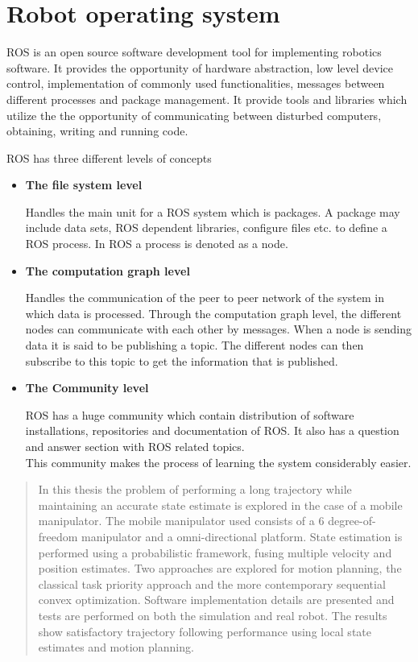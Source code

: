\documentclass[times, utf8, diplomski, english]{fer}
\begin{document}
\chapter{Robot operating system}\label{sec:def_ROS}
ROS is an open source software development tool for implementing robotics software. It provides the opportunity of hardware abstraction, low level device control, implementation of commonly used functionalities, messages between different processes and package management. It provide tools and libraries which utilize the the opportunity of communicating between disturbed computers, obtaining, writing and running code.


ROS has three different levels of concepts

\begin{itemize}
\item \textbf{The file system level}

Handles the main unit for a ROS system which is packages. A package may include data sets, ROS dependent libraries, configure files etc. to define a ROS process. In ROS a process is denoted as a node. 
\item \textbf{The computation graph level}

Handles the communication of the peer to peer network of the system in which data is processed. Through the computation graph level, the different nodes can communicate with each other by messages. When a node is sending data it is said to be publishing a topic. The different nodes can then subscribe to this topic to get the information that is published.
\item \textbf{The Community level}

ROS has a huge community which contain distribution of software installations, repositories and documentation of ROS. It also has a question and answer section with ROS related topics.\\
This community makes the process of learning the system considerably easier.
\end{itemize}
\begin{abstract}
In this thesis the problem of performing a long trajectory while maintaining an accurate state estimate is explored in the case of a mobile manipulator.
The mobile manipulator used consists of a 6 degree-of-freedom manipulator and a omni-directional platform.
State estimation is performed using a probabilistic framework, fusing multiple velocity and position estimates.
Two approaches are explored for motion planning, the classical task priority approach and the more contemporary sequential convex optimization.
Software implementation details are presented and tests are performed on both the simulation and real robot.
The results show satisfactory trajectory following performance using local state estimates and motion planning.

\end{abstract}
\end{document}
